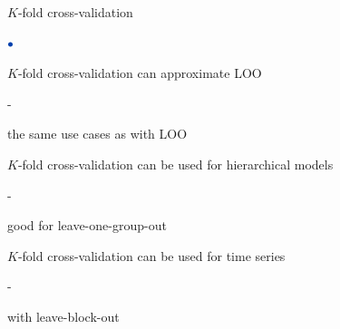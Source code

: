\documentclass[english,t]{beamer}
\newenvironment{list1}{
   \begin{list}{$\color{list1}\bullet$}{\itemsep=6pt}}{
  \end{list}}
\newenvironment{list2}{
  \begin{list}{-}{\baselineskip=12pt\itemsep=2pt}}{
  \end{list}}
\begin{document}
\begin{frame}{$K$-fold cross-validation}

\begin{list1}
\item $K$-fold cross-validation can approximate LOO
  \begin{list2}
    \item the same use cases as with LOO
  \end{list2}
\item $K$-fold cross-validation can be used for hierarchical models
  \begin{list2}
    \item good for leave-one-group-out
  \end{list2}
\item $K$-fold cross-validation can be used for time series
  \begin{list2}
    \item with leave-block-out
  \end{list2}
\end{list1}

\end{frame}
\end{document}
